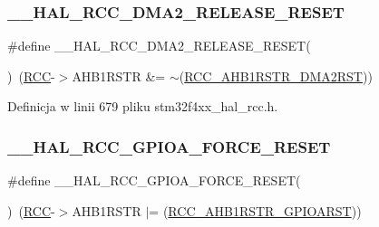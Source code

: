 \subsubsection{\texorpdfstring{\+\_\+\+\_\+\+H\+A\+L\+\_\+\+R\+C\+C\+\_\+\+D\+M\+A2\+\_\+\+R\+E\+L\+E\+A\+S\+E\+\_\+\+R\+E\+S\+ET}{\_\_HAL\_RCC\_DMA2\_RELEASE\_RESET}}
{\footnotesize\ttfamily \#define \+\_\+\+\_\+\+H\+A\+L\+\_\+\+R\+C\+C\+\_\+\+D\+M\+A2\+\_\+\+R\+E\+L\+E\+A\+S\+E\+\_\+\+R\+E\+S\+ET(\begin{DoxyParamCaption}{ }\end{DoxyParamCaption})~(\hyperlink{group___peripheral__declaration_ga74944438a086975793d26ae48d5882d4}{R\+CC}-\/$>$A\+H\+B1\+R\+S\+TR \&= $\sim$(\hyperlink{group___peripheral___registers___bits___definition_ga827aea44c35a0c3eb815a5d7d8546c7b}{R\+C\+C\+\_\+\+A\+H\+B1\+R\+S\+T\+R\+\_\+\+D\+M\+A2\+R\+ST}))}



Definicja w linii 679 pliku stm32f4xx\+\_\+hal\+\_\+rcc.\+h.

\mbox{\label{group___r_c_c___a_h_b1___force___release___reset_gab329bd497cccffd979bcca9fd42bbc79}} 
\subsubsection{\texorpdfstring{\+\_\+\+\_\+\+H\+A\+L\+\_\+\+R\+C\+C\+\_\+\+G\+P\+I\+O\+A\+\_\+\+F\+O\+R\+C\+E\+\_\+\+R\+E\+S\+ET}{\_\_HAL\_RCC\_GPIOA\_FORCE\_RESET}}
{\footnotesize\ttfamily \#define \+\_\+\+\_\+\+H\+A\+L\+\_\+\+R\+C\+C\+\_\+\+G\+P\+I\+O\+A\+\_\+\+F\+O\+R\+C\+E\+\_\+\+R\+E\+S\+ET(\begin{DoxyParamCaption}{ }\end{DoxyParamCaption})~(\hyperlink{group___peripheral__declaration_ga74944438a086975793d26ae48d5882d4}{R\+CC}-\/$>$A\+H\+B1\+R\+S\+TR $\vert$= (\hyperlink{group___peripheral___registers___bits___definition_ga6c171937e46c2b9a58f16ee82010509e}{R\+C\+C\+\_\+\+A\+H\+B1\+R\+S\+T\+R\+\_\+\+G\+P\+I\+O\+A\+R\+ST}))}



